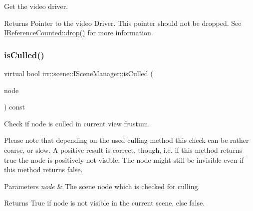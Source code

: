 Get the video driver. 

\begin{DoxyReturn}{Returns}
Pointer to the video Driver. This pointer should not be dropped. See \hyperlink{classirr_1_1IReferenceCounted_a03856a09355b89d178090c4a5f738543}{I\+Reference\+Counted\+::drop()} for more information. 
\end{DoxyReturn}
\mbox{\label{classirr_1_1scene_1_1ISceneManager_aff6c6d553e0faf12bbfd33e814ad4352}} 
\subsubsection{\texorpdfstring{is\+Culled()}{isCulled()}}
{\footnotesize\ttfamily virtual bool irr\+::scene\+::\+I\+Scene\+Manager\+::is\+Culled (\begin{DoxyParamCaption}\item[{const \hyperlink{classirr_1_1scene_1_1ISceneNode}{I\+Scene\+Node} $\ast$}]{node }\end{DoxyParamCaption}) const\hspace{0.3cm}{\ttfamily [pure virtual]}}



Check if node is culled in current view frustum. 

Please note that depending on the used culling method this check can be rather coarse, or slow. A positive result is correct, though, i.\+e. if this method returns true the node is positively not visible. The node might still be invisible even if this method returns false. 
\begin{DoxyParams}{Parameters}
{\em node} & The scene node which is checked for culling. \\
\hline
\end{DoxyParams}
\begin{DoxyReturn}{Returns}
True if node is not visible in the current scene, else false. 
\end{DoxyReturn}
\mbox{\label{classirr_1_1scene_1_1ISceneManager_aa7641dd33e84fca7946ed17047349a3e}} 
